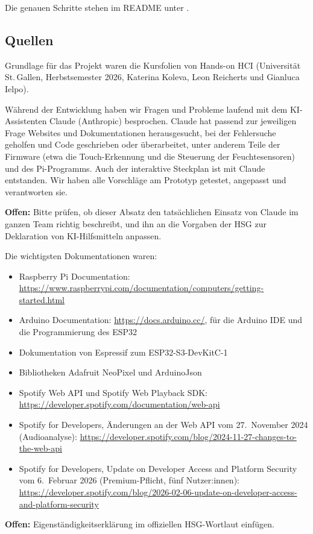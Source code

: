 \documentclass[11pt,a4paper]{article}
\newcommand{\offen}[1]{%
  \par\noindent\colorbox{yellow!25}{\parbox{\dimexpr\linewidth-2\fboxsep}{\small\textbf{Offen:} #1}}\par}
\begin{document}
Die genauen Schritte stehen im README unter .

\subsection{Quellen}

Grundlage für das Projekt waren die Kursfolien von Hands-on HCI (Universität St.\,Gallen, Herbstsemester 2026, Katerina Koleva, Leon Reicherts und Gianluca Ielpo).

Während der Entwicklung haben wir Fragen und Probleme laufend mit dem KI-Assistenten Claude (Anthropic) besprochen. Claude hat passend zur jeweiligen Frage Websites und Dokumentationen herausgesucht, bei der Fehlersuche geholfen und Code geschrieben oder überarbeitet, unter anderem Teile der Firmware (etwa die Touch-Erkennung und die Steuerung der Feuchtesensoren) und des Pi-Programms. Auch der interaktive Steckplan ist mit Claude entstanden. Wir haben alle Vorschläge am Prototyp getestet, angepasst und verantworten sie.

\offen{Bitte prüfen, ob dieser Absatz den tatsächlichen Einsatz von Claude im ganzen Team richtig beschreibt, und ihn an die Vorgaben der HSG zur Deklaration von KI-Hilfsmitteln anpassen.}

Die wichtigsten Dokumentationen waren:

\begin{itemize}[itemsep=2pt]
  \item Raspberry Pi Documentation: \url{https://www.raspberrypi.com/documentation/computers/getting-started.html}
  \item Arduino Documentation: \url{https://docs.arduino.cc/}, für die Arduino IDE und die Programmierung des ESP32
  \item Dokumentation von Espressif zum ESP32-S3-DevKitC-1
  \item Bibliotheken Adafruit NeoPixel und ArduinoJson
  \item Spotify Web API und Spotify Web Playback SDK: \url{https://developer.spotify.com/documentation/web-api}
  \item Spotify for Developers, Änderungen an der Web API vom 27.~November 2024 (Audioanalyse): \url{https://developer.spotify.com/blog/2024-11-27-changes-to-the-web-api}
  \item Spotify for Developers, Update on Developer Access and Platform Security vom 6.~Februar 2026 (Premium-Pflicht, fünf Nutzer:innen): \url{https://developer.spotify.com/blog/2026-02-06-update-on-developer-access-and-platform-security}
\end{itemize}

\offen{Eigenständigkeitserklärung im offiziellen HSG-Wortlaut einfügen.}
\end{document}
